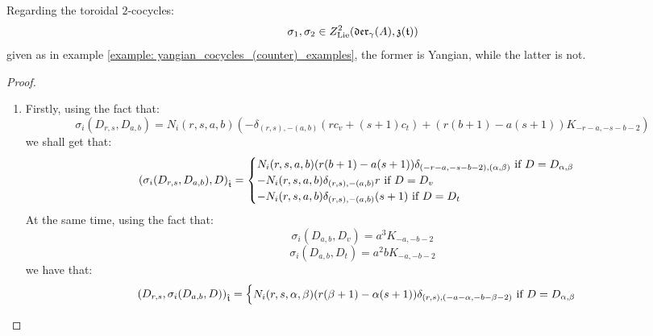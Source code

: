         \begin{proposition} \label{prop: yangianness_of_billig_toroidal_cocycles}
            Regarding the toroidal $2$-cocycles:
                $$\sigma_1, \sigma_2 \in Z^2_{\Lie}(\divzero, \z(\toroidal))$$
            given as in example \ref{example: yangian_cocycles_(counter)_examples}, the former is Yangian, while the latter is not.
        \end{proposition}
            \begin{proof}
                \begin{enumerate}
                    \item Firstly, using the fact that:
                        $$\sigma_i(D_{r, s}, D_{a, b}) = N_i(r, s, a, b) \left( -\delta_{(r, s), -(a, b)} (r c_v + (s + 1) c_t) + ( r(b + 1) - a(s + 1) )K_{-r - a, -s - b - 2} \right)$$
                    we shall get that:
                        $$
                            \left( \sigma_i(D_{r, s}, D_{a, b}), D \right)_{\extendedtoroidal} =
                            \begin{cases}
                                \text{$N_i(r, s, a, b) ( r(b + 1) - a(s + 1) ) \delta_{(-r - a, -s - b - 2), (\alpha, \beta)}$ if $D = D_{\alpha, \beta}$}
                                \\
                                \text{$-N_i(r, s, a, b) \delta_{(r, s), -(a, b)} r$ if $D = D_v$}
                                \\
                                \text{$-N_i(r, s, a, b) \delta_{(r, s), -(a, b)} (s + 1)$ if $D = D_t$}
                            \end{cases}
                        $$
                    At the same time, using the fact that:
                        $$\sigma_i(D_{a, b}, D_v) = a^3 K_{-a, -b - 2}$$
                        $$\sigma_i(D_{a, b}, D_t) = a^2b K_{-a, -b - 2}$$
                    we have that:
                        $$
                            \begin{aligned}
                                \left( D_{r, s}, \sigma_i(D_{a, b}, D) \right)_{\extendedtoroidal} =
                                \begin{cases}
                                    \text{$N_i(r, s, \alpha, \beta) ( r(\beta + 1) - \alpha(s + 1) ) \delta_{(r, s), (-a - \alpha, -b - \beta - 2)}$ if $D = D_{\alpha, \beta}$}
                                    \\

\end{cases}
\end{aligned}$$
\end{enumerate}
\end{proof}

